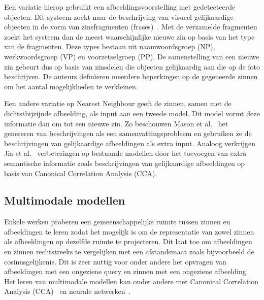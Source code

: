 Een variatie hierop gebruikt een afbeeldingsvoorstelling met gedetecteerde objecten. Dit systeem zoekt naar de beschrijving van visueel gelijkaardige objecten in de vorm van zinsfragmenten (frases)~\cite{Gupta2012,Kuznetsova2012}. Met de verzamelde fragmenten zoekt het systeem dan de meest waarschijnlijke nieuwe zin op basis van het type van de fragmenten. Deze types bestaan uit naamwoordsgroep (NP), werkwoordsgroep (VP) en voorzetselgroep (PP). De samenstelling van een nieuwe zin gebeurt dus op basis van zinsdelen die objecten gelijkaardig aan die op de foto beschrijven. De auteurs defin\"ieren meerdere beperkingen op de gegeneerde zinnen om het aantal mogelijkheden te verkleinen.

Een andere variatie op Nearest Neighbour geeft de zinnen, samen met de dichtstbijzijnde afbeelding, als input aan een tweede model. Dit model vormt deze informatie dan om tot een nieuwe zin. Zo beschouwen Mason et al.~\cite{Mason2014} het genereren van beschrijvingen als een samenvattingsprobleem en gebruiken ze de beschrijvingen van gelijkaardige afbeeldingen als extra input. Analoog verkrijgen Jia et al.~\cite{Fernando2015} verbeteringen op bestaande modellen door het toevoegen van extra semantische informatie zoals beschrijvingen van gelijkaardige afbeeldingen op basis van Canonical Correlation Analysis (CCA).
 
\subsection{Multimodale modellen}
Enkele werken proberen een gemeenschappelijke ruimte tussen zinnen en afbeeldingen te leren zodat het mogelijk is om de representatie van zowel zinnen als afbeeldingen op dezelfde ruimte te projecteren. Dit laat toe om afbeeldingen en zinnen rechtstreeks te vergelijken met een afstandsmaat zoals bijvoorbeeld de cosinusgelijkenis. Dit is zeer nuttig voor onder andere het opvragen van afbeeldingen met een ongeziene query en zinnen met een ongeziene afbeelding. Het leren van multimodale modellen kan onder andere met Canonical Correlation Analysis (CCA)~\cite{Hodosh2013} en neurale netwerken~\cite{Karpathy2014,Kiros2013,Mao2014a}. 

